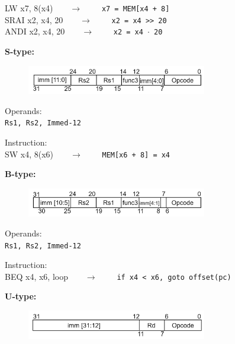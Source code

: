\begin{description}
\begin{description}
		\textsf{LW x7, 8(x4)}\ \ \ \ $\longrightarrow$ \ \ \ \ \texttt{x7 = MEM[x4 + 8]} \\
        \textsf{SRAI x2, x4, 20}\ \ \ \ $\longrightarrow$ \ \ \ \ \texttt{x2 = x4 >> 20} \\
        \textsf{ANDI x2, x4, 20}\ \ \ \ $\longrightarrow$ \ \ \ \ \texttt{x2 = x4 $\cdot$ 20}
	\end{description}
\pagebreak
	\item \textbf{S-type:}
  \begin{figure}[h]
    \center
    \includegraphics[width=0.7\textwidth]{sec1/images/Stype.png}
  \end{figure}
	\begin{description}
		\item Operands:\\
		\texttt{Rs1, Rs2, Immed-12}
		\item Instruction:\\
		\textsf{SW x4, 8(x6)}\ \ \ \ $\longrightarrow$ \ \ \ \ \texttt{MEM[x6 + 8] = x4}\\
	\end{description}
  \item \textbf{B-type:}
  \begin{figure}[h]
    \center
    \includegraphics[width=0.7\textwidth]{sec1/images/Btype.png}
  \end{figure}
	\begin{description}
		\item Operands:\\
		\texttt{Rs1, Rs2, Immed-12}
		\item Instruction:\\
		\textsf{BEQ x4, x6, loop}\ \ \ \ $\longrightarrow$ \ \ \ \ \texttt{if x4 < x6, goto offset(pc)}
	\end{description}
	\item \textbf{U-type:}
  \begin{figure}[h]
    \center
    \includegraphics[width=0.7\textwidth]{sec1/images/Utype.png}

\end{figure}
\end{description}
